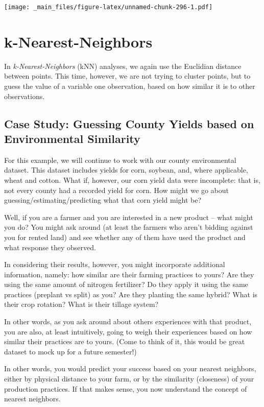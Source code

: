 \documentclass[
]{book}
\begin{document}
\texttt{[image: \_main\_files/figure-latex/unnamed-chunk-296-1.pdf]}

\hypertarget{k-nearest-neighbors}{%
\section{k-Nearest-Neighbors}\label{k-nearest-neighbors}}

In \emph{k-Nearest-Neighbors} (kNN) analyses, we again use the Euclidian distance between points. This time, however, we are not trying to cluster points, but to guess the value of a variable one observation, based on how similar it is to other observations.

\hypertarget{case-study-guessing-county-yields-based-on-environmental-similarity}{%
\subsection{Case Study: Guessing County Yields based on Environmental Similarity}\label{case-study-guessing-county-yields-based-on-environmental-similarity}}

For this example, we will continue to work with our county environmental dataset. This dataset includes yields for corn, soybean, and, where applicable, wheat and cotton. What if, however, our corn yield data were incomplete: that is, not every county had a recorded yield for corn. How might we go about guessing/estimating/predicting what that corn yield might be?

Well, if you are a farmer and you are interested in a new product -- what might you do? You might ask around (at least the farmers who aren't bidding against you for rented land) and see whether any of them have used the product and what response they observed.

In considering their results, however, you might incorporate additional information, namely: how similar are their farming practices to yours? Are they using the same amount of nitrogen fertilizer? Do they apply it using the same practices (preplant vs split) as you? Are they planting the same hybrid? What is their crop rotation? What is their tillage system?

In other words, as you ask around about others experiences with that product, you are also, at least intuitively, going to weigh their experiences based on how similar their practices are to yours. (Come to think of it, this would be great dataset to mock up for a future semester!)

In other words, you would predict your success based on your nearest neighbors, either by physical distance to your farm, or by the similarity (closeness) of your production practices. If that makes sense, you now understand the concept of nearest neighbors.
\end{document}
